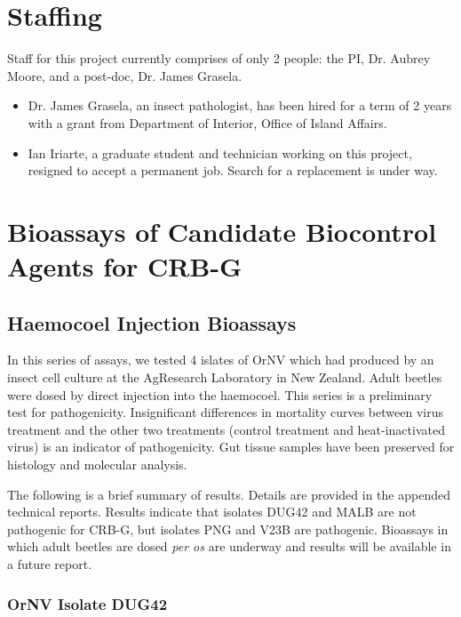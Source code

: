 \documentclass[12pt,letterpaper,english]{scrartcl}
\begin{document}
\section{Staffing}

Staff for this project currently comprises of only 2 people: the PI, Dr. Aubrey Moore, and a post-doc, Dr. James Grasela. 
\begin{itemize}

    \item Dr. James Grasela, an insect pathologist, has been hired for a term of 2 years with a grant from Department of Interior, Office of Island Affairs.

    \item Ian Iriarte, a graduate student and technician working on this project, resigned to accept a permanent job. Search for a replacement is under way.

\end{itemize} 





\newpage
\section{Bioassays of Candidate Biocontrol Agents for CRB-G}


\subsection{Haemocoel Injection Bioassays}

In this series of assays, we tested 4 islates of OrNV which had produced
by an insect cell culture at the AgResearch Laboratory in New Zealand.
Adult beetles were dosed by direct injection into the haemocoel. This
series is a preliminary test for pathogenicity. Insignificant differences
in mortality curves between virus treatment and the other two treatments
(control treatment and heat-inactivated virus) is an indicator of
pathogenicity. Gut tissue samples have been preserved for histology
and molecular analysis. 

The following is a brief summary of results. Details are provided
in the appended technical reports. Results indicate that isolates
DUG42 and MALB are not pathogenic for CRB-G, but isolates PNG and
V23B are pathogenic. Bioassays in which adult beetles are dosed \emph{per
os} are underway and results will be available in a future report.

\subsubsection{OrNV Isolate DUG42}
\end{document}
